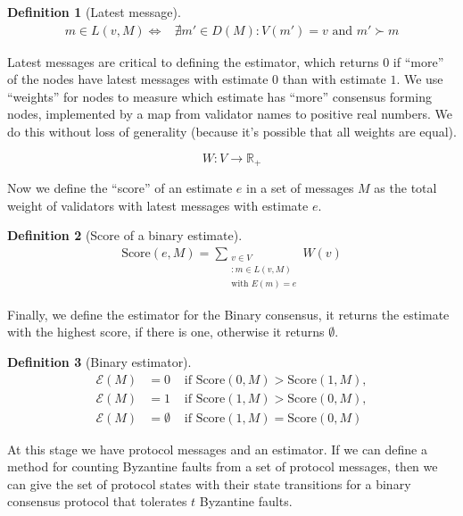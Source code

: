 \documentclass{article}
\theoremstyle{definition}
\newtheorem{defn}{Definition}[section]
\begin{document}
\begin{defn}[Latest message]
\begin{equation*}
\begin{split}
m \in L(v, M) \iff & \nexists m' \in D(M) : V(m') = v \text{ and } m' \succ m
\end{split}
\end{equation*}
\end{defn}

Latest messages are critical to defining the estimator, which returns $0$ if ``more'' of the nodes have latest messages with estimate $0$ than with estimate $1$. We use ``weights'' for nodes to measure which estimate has ``more'' consensus forming nodes, implemented by a map from validator names to positive real numbers. We do this without loss of generality (because it's possible that all weights are equal).

$$
W:V \to \mathbb{R}_+
$$


Now we define the ``score'' of an estimate $e$ in a set of messages $M$ as the total weight of validators with latest messages with estimate $e$.

\begin{defn}[Score of a binary estimate]
\begin{align}
\text{Score}(e, M) = \sum_{\substack{v \in V \\ : m \in L(v,M) \\ \text{with } E(m) = e}} W(v)
\end{align}
\end{defn}

Finally, we define the estimator for the Binary consensus, it returns the estimate with the highest score, if there is one, otherwise it returns $\emptyset$.

\begin{defn}[Binary estimator]
\begin{align}
  \mathcal{E}(M) &= 0 &\text{ if } \text{Score}(0, M) > \text{Score}(1, M), \\
  \mathcal{E}(M) &= 1 &\text{ if } \text{Score}(1, M) > \text{Score}(0, M), \\
  \mathcal{E}(M) &= \emptyset &\text{ if } \text{Score}(1, M) = \text{Score}(0, M)
\end{align}
\end{defn}

At this stage we have protocol messages and an estimator. If we can define a method for counting Byzantine faults from a set of protocol messages, then we can give the set of protocol states with their state transitions for a binary consensus protocol that tolerates $t$ Byzantine faults.
\end{document}
